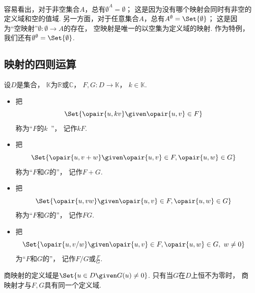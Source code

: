 
容易看出，对于非空集合\(A\)，总有\(\emptyset^A = \emptyset\)；
这是因为没有哪个映射会同时有非空的定义域和空的值域.
另一方面，对于任意集合\(A\)，总有\(A^\emptyset = \Set{\emptyset}\)；
这是因为“空映射”\(\emptyset\colon \emptyset \to A\)的存在，
空映射是唯一的以空集为定义域的映射.
作为特例，我们还有\(\emptyset^\emptyset=\Set{\emptyset}\).

\subsection{映射的四则运算}
\begin{definition}
设\(D\)是集合，
\(\mathbb{K}\)为\(\mathbb{R}\)或\(\mathbb{C}\)，
\(F,G\colon D\to\mathbb{K}\)，
\(k\in\mathbb{K}\).
\begin{itemize}
	\item 把\begin{equation*}
		\Set{ \opair{u,kv} \given \opair{u,v} \in F }
	\end{equation*}称为“\(F\)的\(k\)~”，
	记作\(k F\).
	\item 把\begin{equation*}
		\Set{ \opair{u,v+w} \given \opair{u,v} \in F, \opair{u,w} \in G }
	\end{equation*}称为“\(F\)和\(G\)的”，
	记作\(F + G\).
	\item 把\begin{equation*}
		\Set{ \opair{u,vw} \given \opair{u,v} \in F, \opair{u,w} \in G }
	\end{equation*}称为“\(F\)和\(G\)的”，
	记作\(F G\).
	\item 把\begin{equation*}
		\Set{ \opair{u,v/w} \given \opair{u,v} \in F, \opair{u,w} \in G,\ w\neq0 }
	\end{equation*}为“\(F\)和\(G\)的”，
	记作\(F/G\)或\(\frac{F}{G}\).
\end{itemize}
商映射的定义域是\(\Set{u\in D\given G(u)\neq0}\).
只有当\(G\)在\(D\)上恒不为零时，
商映射才与\(F,G\)具有同一个定义域.
\end{definition}
